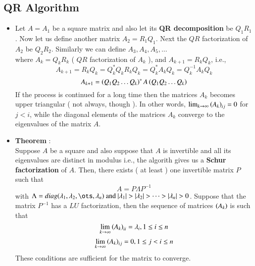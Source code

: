 \documentclass[report,12pt,onecolumn]{IEEEtran}
\theoremstyle{remark}
\begin{document}
\begin{itemize}
		\section{QR Algorithm}
		\begin{itemize}
			\item Let $A = A_1$ be a square matrix and also let its \textbf{QR decomposition} be $Q_1 R_1$. Now let us define another matrix $A_2 = R_1 Q_1$. Next the $QR$ factorization of $A_2$ be $Q_2 R_2$. Similarly we can define $A_3, A_4, A_5, \dots $ \\
				where $A_k = Q_k R_k $ ( $QR$ factorization of $A_k$ ), and $A_{k+1} = R_k Q_k$, i.e., \\
				$$ A_{k+1} = R_k Q_k = Q_{k}^{*} Q_k R_k Q_k = Q_{k}^{*} A_k Q_k = Q_{k}^{-1} A_k Q_k $$
				$$ A_{k+1} = \left(Q_1 Q_2 \dots Q_k\right)^{*} A \left(Q_1 Q_2 \dots Q_k\right) $$
				If the process is continued for a long time then the matrices $A_k$ becomes upper triangular ( not always, though ). In other words, $\lim_{k \to \infty} \left(A_k\right)_{ij} = 0$ for $j < i$, while the diagonal elements of the matrices $A_k$ converge to the eigenvalues of the matrix $A$.
			\item \textbf{Theorem} : \\
				Suppose $A$ be a square and also suppose that $A$ is invertible and all its eigenvalues are distinct in modulus i.e., the algorith gives us a \textbf{Schur factorization} of $A$. Then, there exists ( at least ) one invertible matrix $P$ such that 
				$$ A = P \Lambda P^{-1} $$
				with $\Lambda = diag(\lambda_1, \lambda_2, \ots, \lambda_n) \text{ and } |\lambda_1| > |\lambda_2| > \dots > |\lambda_n| > 0 $. Suppose that the matrix $P^{-1}$ has a $LU$ factorization, then the sequence of matrices $\left(A_k\right)$ is such that 
				$$ \lim_{k \to \infty} \left(A_k\right)_{ii} = \lambda_i, 1 \leq i \leq n $$
				$$ \lim_{k \to \infty} \left(A_k\right)_{ij} = 0, 1 \leq j < i \leq n $$
				These conditions are sufficient for the matrix to converge.
		\end{itemize}

\end{itemize}
\end{document}
